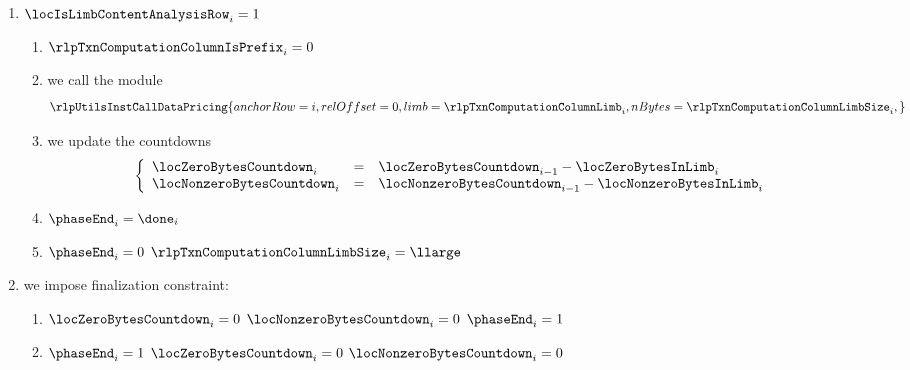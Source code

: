 \begin{enumerate}[resume]
	\item \If $\locIsLimbContentAnalysisRow _{i} = 1$ \Then
		\begin{enumerate}
			\item $\rlpTxnComputationColumnIsPrefix     _{i} = 0$
			\item we call the \rlpUtilsMod{} module
				\[
					\rlpUtilsInstCallDataPricing {
						anchorRow = i              ,
						relOffset = 0              ,
						limb      = \rlpTxnComputationColumnLimb     _{i} ,
						nBytes    = \rlpTxnComputationColumnLimbSize _{i} ,
					}
				\]
			\item we update the countdowns
				\[
					\left\{ \begin{array}{lcl}
						\locZeroBytesCountdown    _{i} & = & \locZeroBytesCountdown    _{i - 1} - \locZeroBytesInLimb    _{i} \\
						\locNonzeroBytesCountdown _{i} & = & \locNonzeroBytesCountdown _{i - 1} - \locNonzeroBytesInLimb _{i} \\
					\end{array} \right.
				\]
			\item $\phaseEnd _{i} = \done _{i}$
			\item \If $\phaseEnd _{i} = 0$ \Then $\rlpTxnComputationColumnLimbSize _{i} = \llarge$
		\end{enumerate}
	\item we impose finalization constraint:
		\begin{enumerate}[resume]
			\item \If $\locZeroBytesCountdown _{i} = 0$ \et $\locNonzeroBytesCountdown _{i} = 0$ \Then $\phaseEnd _{i} = 1$
			\item \If $\phaseEnd _{i} = 1$ \Then $\locZeroBytesCountdown _{i} = 0$ \et   $\locNonzeroBytesCountdown _{i} = 0$
		\end{enumerate}
\end{enumerate}

